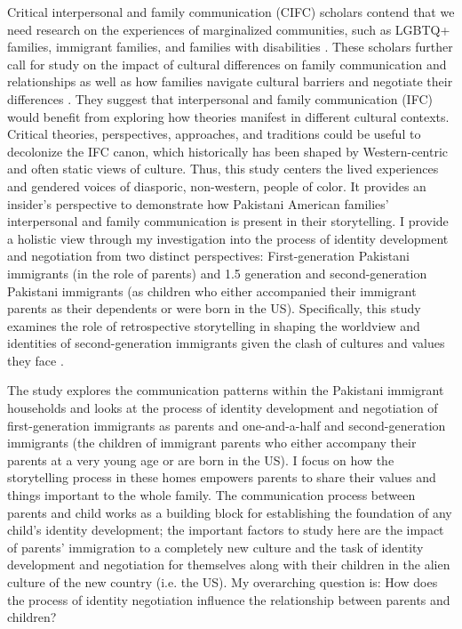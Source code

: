 Critical interpersonal and family communication (CIFC) scholars contend that we need research on the experiences of marginalized communities, such as LGBTQ+ families, immigrant families, and families with disabilities \citep{faulknerSettingAgendaPoetic2023, manningHammerCriticalTurn2021, mooreWhatCountsCritical2019}. These scholars further call for study on the impact of cultural differences on family communication and relationships as well as how families navigate cultural barriers and negotiate their differences \citep{manningHammerCriticalTurn2021}. They suggest that interpersonal and family communication (IFC) would benefit from exploring how theories manifest in different cultural contexts. Critical theories, perspectives, approaches, and traditions could be useful to decolonize the IFC canon, which historically has been shaped by Western-centric and often static views of culture. Thus, this study centers the lived experiences and gendered voices of diasporic, non-western, people of color. It provides an insider's perspective to demonstrate how Pakistani American families’ interpersonal and family communication is present in their storytelling. I provide a holistic view through my investigation into the process of identity development and negotiation from two distinct perspectives: First-generation Pakistani immigrants (in the role of parents) and 1.5 generation and second-generation Pakistani immigrants (as children who either accompanied their immigrant parents as their dependents or were born in the US). Specifically, this study examines the role of retrospective storytelling in shaping the worldview and identities of second-generation immigrants given the clash of cultures and values they face \citep{koenigkellasCommunicatedNarrativeSenseMaking2022, koenigkellasFamilyStoriesStorytelling2012}.

The study explores the communication patterns within the Pakistani immigrant households and looks at the process of identity development and negotiation of first-generation immigrants as parents and one-and-a-half and second-generation immigrants (the children of immigrant parents who either accompany their parents at a very young age or are born in the US). I focus on how the storytelling process in these homes empowers parents to share their values and things important to the whole family. The communication process between parents and child works as a building block for establishing the foundation of any child’s identity development; the important factors to study here are the impact of parents' immigration to a completely new culture and the task of identity development and negotiation for themselves along with their children in the alien culture of the new country (i.e.  the US). My overarching question is: How does the process of identity negotiation influence the relationship between parents and children? 


